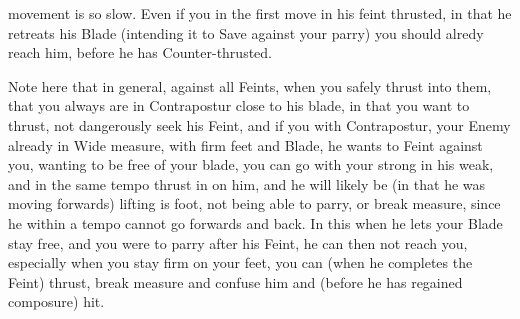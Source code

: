 \newpage


\newpage


movement is so slow. Even if you in the first move in his feint
thrusted, in that he retreats his Blade (intending it to Save against
your parry) you should alredy reach him, before he has
Counter-thrusted.


Note here that in general, against all Feints, when you safely thrust
into them, that you always are in Contrapostur close to his blade, in
that you want to thrust, not dangerously seek his Feint, and if you
with Contrapostur, your Enemy already in Wide measure, with firm feet
and Blade, he wants to Feint against you, wanting to be free of your
blade, you can go with your strong in his weak, and in the same tempo
thrust in on him, and he will likely be (in that he was moving forwards)
lifting is foot, not being able to parry, or break measure, since he
within a tempo cannot go forwards and back. In this when he lets your
Blade stay free, and you were to parry after his Feint, he can then
not reach you, especially when you stay firm on your feet, you can
(when he completes the Feint) thrust, break measure and confuse him
and (before he has regained composure) hit.


